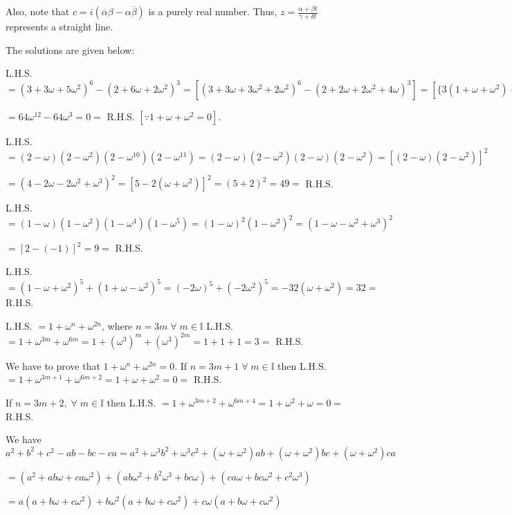  Also, note that $c = i(\overline{\alpha}\beta - \alpha\overline{\beta})$ is a purely real number. Thus, $z
  = \frac{\alpha + \beta t}{\gamma + \delta t}$ represents a straight line.
\item The solutions are given below:
  \startitemize[i]
  \item L.H.S. $= (3 + 3\omega + 5\omega^2)^6 - (2 + 6\omega + 2\omega^2)^3 = [(3 + 3\omega + 3\omega^2 +
    2\omega^2)^6 - (2 + 2\omega + 2\omega^2 + 4\omega)^3] = [\{3(1 + \omega + \omega^2) + 2\omega^2\}^6] -
    [\{2(1 + \omega + \omega^2) + 4\omega\}^3]$

    $= 64\omega^{12} - 64\omega^3 = 0 =$ R.H.S. $[\because 1 + \omega + \omega^2 = 0]$.
  \item L.H.S. $= (2 - \omega)(2 - \omega^2)(2 - \omega^{10})(2 - \omega^{11}) = (2 - \omega)(2 -
    \omega^2)(2 - \omega)(2 - \omega^2) = [(2 - \omega)(2 - \omega^2)]^2$

    $= (4 - 2\omega - 2\omega^2 + \omega^3)^2 = [5 - 2(\omega + \omega^2)]^2 = (5 + 2)^2 = 49 =$ R.H.S.
  \item L.H.S. $= (1 - \omega)(1 - \omega^2)(1 - \omega^4)(1 - \omega^5) = (1 - \omega)^2(1 - \omega^2)^2 =
    (1 - \omega - \omega^2 + \omega^3)^2$

    $= [2 - (-1)]^2 = 9 =$ R.H.S.
  \item L.H.S. $= (1 - \omega + \omega^2)^5 + (1 + \omega - \omega^2)^5 = (-2\omega)^5 + (-2\omega^2)^5 =
    -32(\omega + \omega^2) = 32 =$ R.H.S.
  \item L.H.S. $= 1 + \omega^n + \omega^{2n}$, where $n = 3m\;\forall\;m\in \mathbb{I}$ L.H.S. $= 1 +
    \omega^{3m} + \omega^{6m} = 1 + (\omega^3)^m + (\omega^3)^{2m} = 1 + 1 + 1 = 3 =$ R.H.S.
  \item We have to prove that $1 + \omega^n + \omega^{2n} = 0$. If $n = 3m + 1\;\forall\;m\in\mathbb{I}$
    then L.H.S. $= 1 + \omega^{3m + 1} + \omega^{6m + 2} = 1 + \omega + \omega^2 = 0 =$ R.H.S.

    If $n = 3m + 2,\;\forall\;m\in\mathbb{I}$ then L.H.S. $= 1 + \omega^{3m + 2} + \omega^{6m + 4} = 1 +
    \omega^2 + \omega = 0 =$ R.H.S.
  \stopitemize
\item We have $a^2 + b^2 + c^2 - ab - bc - ca = a^2 + \omega^3b^2 + \omega^3c^2 + (\omega + \omega^2)ab +
  (\omega + \omega^2)bc + (\omega + \omega^2)ca$

  $= (a^2 + ab\omega + ca\omega^2) + (ab\omega^2 + b^2\omega^3 + bc\omega) + (ca\omega + bc\omega^2 +
  c^2\omega^3)$

  $= a(a + b\omega + c\omega^2) + b\omega^2(a + b\omega + c\omega^2) + c\omega(a + b\omega + c\omega^2)$


